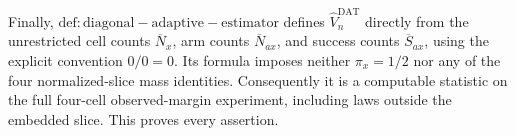 Finally, \(\mathrm{def:diagonal-adaptive-estimator}\) defines \(\widehat V_n^{\mathrm{DAT}}\) directly from the unrestricted cell counts \(\overline N_x\), arm counts \(\overline N_{ax}\), and success counts \(\overline S_{ax}\), using the explicit convention \(0/0=0\).  Its formula imposes neither \(\pi_x=1/2\) nor any of the four normalized-slice mass identities.  Consequently it is a computable statistic on the full four-cell observed-margin experiment, including laws outside the embedded slice.  This proves every assertion.